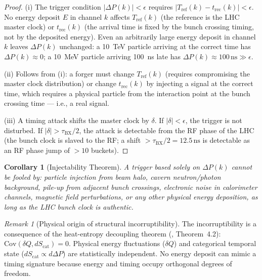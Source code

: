 \documentclass[twocolumn,10pt,a4paper]{article}
\theoremstyle{thmstyle}
\newtheorem{corollary}[theorem]{Corollary}
\theoremstyle{definition}
\theoremstyle{remark}
\newtheorem{remark}[theorem]{Remark}
\newcommand{\tBX}{\tau_{\mathrm{BX}}}
\newcommand{\DeltaP}{\Delta P}
\begin{document}
\begin{proof}
(i) The trigger condition $|\DeltaP(k)| < \epsilon$ requires
$|T_{\mathrm{ref}}(k) - t_{\mathrm{rec}}(k)| < \epsilon$.
No energy deposit $E$ in channel $k$ affects $T_{\mathrm{ref}}(k)$
(the reference is the LHC master clock) or $t_{\mathrm{rec}}(k)$
(the arrival time is fixed by the bunch crossing timing, not by the
deposited energy). Even an arbitrarily large energy deposit in channel
$k$ leaves $\DeltaP(k)$ unchanged: a 10~TeV particle arriving at
the correct time has $\DeltaP(k) \approx 0$; a 10~MeV particle
arriving 100~ns late has $\DeltaP(k) \approx 100\,\mathrm{ns} \gg \epsilon$.

(ii) Follows from (i): a forger must change $T_{\mathrm{ref}}(k)$
(requires compromising the master clock distribution) or change
$t_{\mathrm{rec}}(k)$ by injecting a signal at the correct time,
which requires a physical particle from the interaction point
at the bunch crossing time --- i.e., a real signal.

(iii) A timing attack shifts the master clock by $\delta$. If
$|\delta| < \epsilon$, the trigger is not disturbed.
If $|\delta| > \tBX/2$, the attack is detectable from the RF phase
of the LHC (the bunch clock is slaved to the RF; a shift
$> \tBX/2 = 12.5\,\mathrm{ns}$ is detectable as an RF phase jump
of $> 10$ buckets).
\end{proof}

\begin{corollary}[Injectability Theorem]
\label{cor:injectability}
A trigger based solely on $\DeltaP(k)$ cannot be fooled by:
particle injection from beam halo, cavern neutron/photon background,
pile-up from adjacent bunch crossings, electronic noise in calorimeter
channels, magnetic field perturbations, or any other physical energy
deposition, as long as the LHC bunch clock is authentic.
\end{corollary}

\begin{remark}[Physical origin of structural incorruptibility]
The incorruptibility is a consequence of the heat-entropy decoupling
theorem (\citealt{companion:qnd}, Theorem~4.2):
$\mathrm{Cov}(\delta Q, dS_{\mathrm{cat}}) = 0$.
Physical energy fluctuations ($\delta Q$) and categorical temporal state
($dS_{\mathrm{cat}} \propto d\DeltaP$) are statistically independent.
No energy deposit can mimic a timing signature because energy and timing
occupy orthogonal degrees of freedom.
\end{remark}
\end{document}
